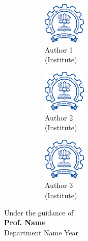 \documentclass{article}
\begin{document}
\begin{titlepage}
\begin{center}
                \begin{figure}[h]
                    \begin{subfigure}{0.3\textwidth}
                        \centering
                        \medskip
                        \includegraphics[width=0.8in]{iit}\\
                        Author 1\\(Institute)
                    \end{subfigure}
                    \hfill
                    \begin{subfigure}{0.3\textwidth}
                        \centering
                        \medskip
                        \includegraphics[width=0.8in]{iit}\\
                        Author 2\\(Institute)
                    \end{subfigure}
                    \hfill
                    \begin{subfigure}{0.3\textwidth}
                        \centering
                        \medskip
                        \includegraphics[width=0.8in]{iit}\\
                        Author 3\\(Institute)
                    \end{subfigure}
                \end{figure}
            \vfill
            Under the guidance of \\
            \medskip
            \textbf{Prof. Name}\\
            \medskip
            Department Name
            \vfill
            Year
        \end{center}
    \end{titlepage}

	\lipsum[1-10]
\end{document}
